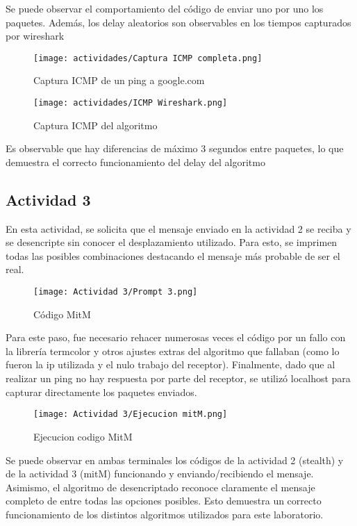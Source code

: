 \documentclass[letter,12pt]{article}
\begin{document}
Se puede observar el comportamiento del código de enviar uno por uno los paquetes. Además, los delay aleatorios son observables en los tiempos capturados por wireshark
\begin{figure} [H]
    \centering
    \texttt{[image: actividades/Captura ICMP completa.png]}
    \caption{Captura ICMP de un ping a google.com}
    \label{fig:enter-label}
\end{figure}
\begin{figure} [H]
    \centering
    \texttt{[image: actividades/ICMP Wireshark.png]}
    \caption{Captura ICMP del algoritmo}
    \label{fig:enter-label}
\end{figure}

Es observable que hay diferencias de máximo 3 segundos entre paquetes, lo que demuestra el correcto funcionamiento del delay del algoritmo
\subsection{Actividad 3}
En esta actividad, se solicita que el mensaje enviado en la actividad 2 se reciba y se desencripte sin conocer el desplazamiento utilizado. Para esto, se imprimen todas las posibles combinaciones destacando el mensaje más probable de ser el real.
\begin{figure} [H]
    \centering
    \texttt{[image: Actividad 3/Prompt 3.png]}
    \caption{Código MitM}
    \label{fig:enter-label}
\end{figure}
Para este paso, fue necesario rehacer numerosas veces el código por un fallo con la librería termcolor y otros ajustes extras del algoritmo que fallaban (como lo fueron la ip utilizada y el nulo trabajo del receptor). Finalmente, dado que al realizar un ping no hay respuesta por parte del receptor, se utilizó localhost para capturar directamente los paquetes enviados.
\begin{figure} [H]
    \centering
    \texttt{[image: Actividad 3/Ejecucion mitM.png]}
    \caption{Ejecucion codigo MitM}
    \label{fig:enter-label}
\end{figure}

Se puede observar en ambas terminales los códigos de la actividad 2 (stealth) y de la actividad 3 (mitM) funcionando y enviando/recibiendo el mensaje. Asimismo, el algoritmo de desencriptado reconoce claramente el mensaje completo de entre todas las opciones posibles. Esto demuestra un correcto funcionamiento de los distintos algoritmos utilizados para este laboratorio.
\end{document}
